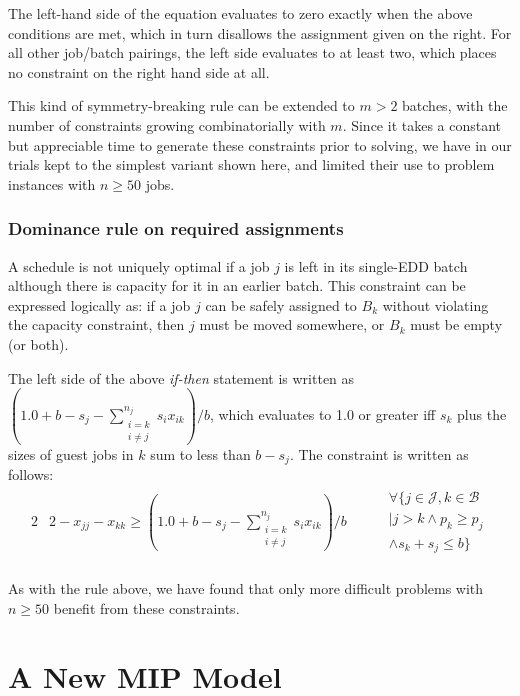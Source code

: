 \documentclass[oribibl]{llncs}
\begin{document}
The left-hand side of the equation evaluates to zero exactly when the above
conditions are met, which in turn disallows the assignment given on the right.
For all other job/batch pairings, the left side evaluates to at least two, which
places no constraint on the right hand side at all.

This kind of symmetry-breaking rule can be extended to 
$m > 2$ batches, with the number of constraints growing combinatorially with $m$. Since it takes
a constant but appreciable time to generate these constraints prior to solving,
we have in our trials kept to the simplest variant shown here, and limited their
use to problem instances with $n \geq 50$ jobs.

\subsubsection{Dominance rule on required assignments}
A schedule is not uniquely optimal if a job $j$ is left in its single-EDD batch
although there is capacity for it in an earlier batch. This constraint can
be expressed logically as: if a job $j$ can be safely assigned to $B_k$ without
violating the capacity constraint, then $j$ must be moved somewhere, or
$B_k$ must be empty (or both). 

The left side of the above \textit{if-then} statement is written as $(1.0 + b -
s_j - \sum_{\substack{{i = k}\\{i \neq j}}}^{n_j} s_i x_{ik}) / b$, which
evaluates to 1.0 or greater iff $s_k$ plus the sizes of guest jobs in $k$ sum to
less than $b - s_j$. The constraint is written as follows:
\begin{alignat}{2}
&2 - x_{jj} - x_{kk} \geq \left(1.0 + b - s_j -
\sum_{\substack{{i = k}\\{i \neq j}}}^{n_j} s_i
x_{ik}\right) / b \quad && \begin{gathered} \forall \{ j \in \mathcal{J}, k \in \mathcal{B}\\| j > k 
\land p_k \geq p_j \\ \land s_k + s_j \leq b\}\end{gathered}
\end{alignat}\\

As with the rule above, we have found that only more difficult problems with $n
\geq 50$ benefit from these constraints.

\section{A New MIP Model}
\label{sec:newMIPmodel}
\end{document}
